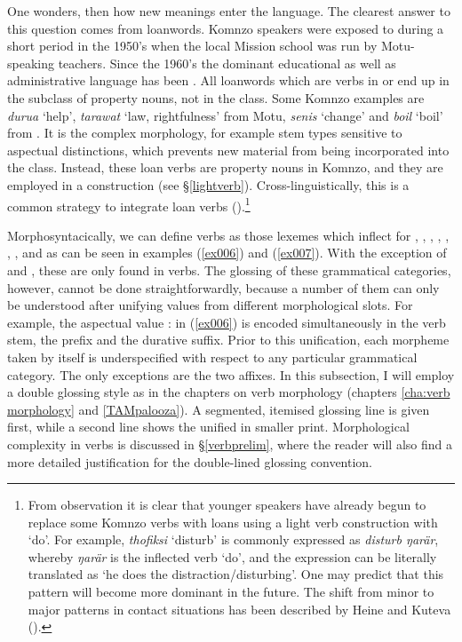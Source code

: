 One wonders, then how new  meanings enter the language. The clearest answer to this question comes from loanwords. Komnzo speakers were exposed to  during a short period in the 1950's when the local Mission school was run by Motu-speaking teachers. Since the 1960's the dominant educational as well as administrative language has been . All loanwords which are verbs in  or  end up in the  subclass of property nouns, not in the  class. Some Komnzo examples are \emph{durua} `help', \emph{tarawat} `law, rightfulness' from Motu, \emph{senis} `change' and \emph{boil} `boil' from . It is the complex  morphology, for example stem types sensitive to aspectual distinctions, which prevents new material from being incorporated into the  class. Instead, these loan verbs are property nouns in Komnzo, and they are employed in a  construction (see \S{}\ref{lightverb}). Cross-linguistically, this is a common strategy to integrate loan verbs (\citealt{Wichmann:2008loanverbs}).\footnote{From observation it is clear that younger speakers have already begun to replace some Komnzo verbs with  loans using a light verb construction with `do'. For example, \emph{thofiksi} `disturb' is commonly expressed as \emph{disturb ŋarär}, whereby \emph{ŋarär} is the inflected verb `do', and the expression can be literally translated as `he does the distraction/disturbing'. One may predict that this pattern will become more dominant in the future. The shift from minor to major patterns in contact situations has been described by Heine and Kuteva (\citeyear[44]{Heine:2005wp}).}%

Morphosyntacically, we can define verbs as those lexemes which inflect for , , , , , , , and  as can be seen in examples (\ref{ex006}) and (\ref{ex007}). With the exception of  and , these are only found in verbs. The glossing of these grammatical categories, however, cannot be done straightforwardly, because a number of them can only be understood after unifying values from different morphological slots. For example, the aspectual value \Pst:\Dur{} in (\ref{ex006}) is encoded simultaneously in the verb stem, the prefix and the durative suffix. Prior to this unification, each morpheme taken by itself is underspecified with respect to any particular grammatical category. The only exceptions are the two  affixes. In this subsection, I will employ a double glossing style as in the chapters on verb morphology (chapters \ref{cha:verb morphology} and \ref{TAMpalooza}). A segmented, itemised glossing line is given first, while a second line shows the unified  in smaller print. Morphological complexity in verbs is discussed in \S{}\ref{verbprelim}, where the reader will also find a more detailed justification for the double-lined glossing convention.

